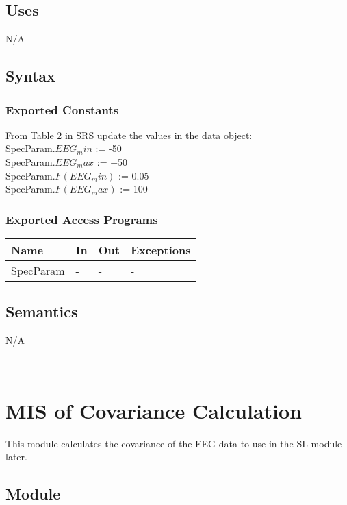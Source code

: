 \documentclass[12pt, titlepage]{article}
\begin{document}
\subsection{Uses}

N/A

\subsection{Syntax}

\subsubsection{Exported Constants}

From Table 2 in SRS update the values in the data object:\\
SpecParam.$EEG_min$ := -50\\
SpecParam.$EEG_max$ := +50\\
SpecParam.$F(EEG_min)$ := 0.05\\
SpecParam.$F(EEG_max)$ := 100\\


\subsubsection{Exported Access Programs}

\begin{center}
\begin{tabular}{p{2cm} p{4cm} p{4cm} p{2cm}}
\hline
\textbf{Name} & \textbf{In} & \textbf{Out} & \textbf{Exceptions} \\
\hline
SpecParam & - & - & - \\
\hline
\end{tabular}
\end{center}

\subsection{Semantics}
N/A


~\newpage

\section{MIS of Covariance Calculation} \label{Cov} 
This module calculates the covariance of the  EEG data to use in the SL module later.

\subsection{Module}
\end{document}
